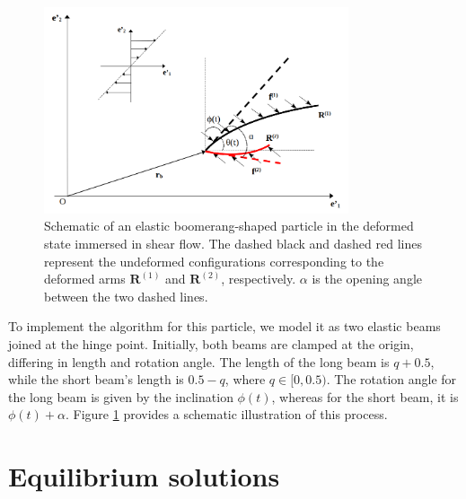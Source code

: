 \documentclass[a4paper,12pt]{report}
\begin{document}
\begin{figure}[!h]
	\begin{center}
		\includegraphics[width=0.8\textwidth]{plot/fluid.png}
		\caption{Schematic of an elastic boomerang-shaped particle in the deformed state immersed in shear flow. The dashed black and dashed red lines represent the undeformed configurations corresponding to the deformed arms $\mathbf{R}^{(1)}$ and $\mathbf{R}^{(2)}$, respectively. $\alpha$ is the opening angle between the two dashed lines.} 
		\label{fig:6}
	\end{center}
\end{figure}
To implement the algorithm for this particle, we model it as two elastic beams joined at the hinge point. Initially, both beams are clamped at the origin, differing in length and rotation angle. The length of the long beam is $q+0.5$, while the short beam's length is $0.5-q$, where $q \in [0,0.5)$. The rotation angle for the long beam is given by the inclination $\phi(t)$, whereas for the short beam, it is $\phi(t)+\alpha$. Figure \ref{fig:6} provides a schematic illustration of this process. 

\section{Equilibrium solutions}
\end{document}
